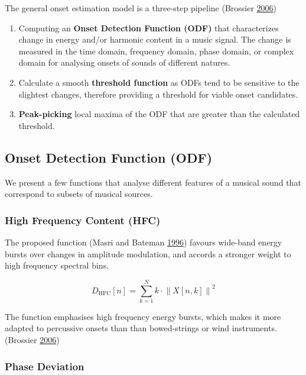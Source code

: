 \documentclass[
  american,
]{article}
\providecommand{\tightlist}{%
  \setlength{\itemsep}{0pt}\setlength{\parskip}{0pt}}
\begin{document}
The general onset estimation model is a three-step pipeline (Brossier \protect\hyperlink{ref-brossier}{2006})

\begin{enumerate}
\def\labelenumi{\arabic{enumi}.}
\tightlist
\item
  Computing an \textbf{Onset Detection Function (ODF)} that
  characterizes change in energy and/or harmonic content
  in a music signal.
  The change is measured in the time domain, frequency domain,
  phase domain, or complex domain for analysing onsets
  of sounds of different natures.
\item
  Calculate a smooth \textbf{threshold function} as ODFs
  tend to be sensitive to the slightest changes, therefore
  providing a threshold for viable onset candidates.
\item
  \textbf{Peak-picking} local maxima of the ODF that are
  greater than the calculated threshold.
\end{enumerate}

\hypertarget{onset-detection-function-odf}{%
\subsection{Onset Detection Function (ODF)}\label{onset-detection-function-odf}}

We present a few functions that analyse different features
of a musical sound that correspond to subsets of musical sources.

\hypertarget{high-frequency-content-hfc}{%
\subsubsection{High Frequency Content (HFC)}\label{high-frequency-content-hfc}}

The proposed function (Masri and Bateman \protect\hyperlink{ref-hfc}{1996}) favours wide-band energy bursts
over changes in amplitude modulation, and accords a stronger weight
to high frequency spectral bins.

\[D_{\text{HFC}}[n] = \sum\limits_{k=1}^{N}
    k\cdot\left\lVert X[n,k]\right\rVert^2\]

The function emphasises high frequency energy bursts,
which makes it more adapted to percussive onsets than
than bowed-strings or wind instruments. (Brossier \protect\hyperlink{ref-brossier}{2006})

\hypertarget{phase-deviation}{%
\subsubsection{Phase Deviation}\label{phase-deviation}}
\end{document}
